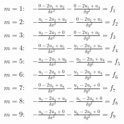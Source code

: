 \documentclass[a4paper,11pt]{article}
\begin{document}
\begin{enumerate}
\[\begin{array}{l}
m=1:\quad {\displaystyle -\frac{0-2u_{1}+u_{2}}{\delta x^2}-\frac{0-2u_{1}+u_{4}}{\delta y^2} }=f_{1} \\
m=2:\quad {\displaystyle -\frac{u_{1}-2u_{2}+u_{3}}{\delta x^2}-\frac{0-2u_{2}+u_{5}}{\delta y^2} }=f_{2} \\
m=3:\quad {\displaystyle -\frac{u_{2}-2u_{3}+0}{\delta x^2}-\frac{0-2u_{3}+u_{6}}{\delta y^2} }=f_{3} \\
m=4:\quad {\displaystyle -\frac{0-2u_{4}+u_{5}}{\delta x^2}-\frac{u_{1}-2u_{4}+u_{7}}{\delta y^2} }=f_{4} \\
m=5:\quad {\displaystyle -\frac{u_{4}-2u_{5}+u_{6}}{\delta x^2}-\frac{u_{2}-2u_{5}+u_{8}}{\delta y^2} }=f_{5} \\
m=6:\quad {\displaystyle -\frac{u_{5}-2u_{6}+0}{\delta x^2}-\frac{u_{3}-2u_{6}+u_{9}}{\delta y^2} }=f_{6} \\
m=7:\quad {\displaystyle -\frac{0-2u_{7}+u_{8}}{\delta x^2}-\frac{u_{4}-2u_{7}+0}{\delta y^2} }=f_{7} \\
m=8:\quad {\displaystyle -\frac{u_{7}-2u_{8}+u_{9}}{\delta x^2}-\frac{u_{5}-2u_{8}+0}{\delta y^2} }=f_{8} \\
m=9:\quad {\displaystyle -\frac{u_{8}-2u_{9}+0}{\delta x^2}-\frac{u_{6}-2u_{9}+0}{\delta y^2} }=f_{9} \\
\end{array}
\]


\end{enumerate}
\end{document}
